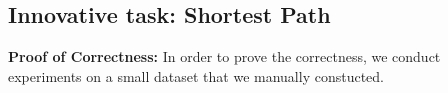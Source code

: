\subsection{Innovative task: Shortest Path}
{\bf Proof of Correctness: } In order to prove the correctness, we conduct experiments on a small dataset that we manually constucted. 